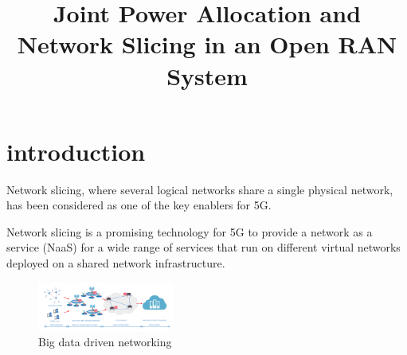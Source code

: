\documentclass[conference]{IEEEtran}
\begin{document}
\title{Joint Power Allocation and Network Slicing in an Open RAN System \vspace{-.1cm}
}
%
  \author{
  }

\maketitle

\begin{abstract}

\end{abstract}
\begin{IEEEkeywords}

\end{IEEEkeywords}
\section{introduction}
Network slicing, where several logical
networks share a single physical network, has been considered as one of
the key enablers for 5G. 

Network slicing is a promising technology for
5G to provide a network as a service (NaaS) for a wide range of
services that run on different virtual networks deployed on a
shared network infrastructure. 

\begin{figure}[h!]
\centering
\includegraphics[width=0.4\textwidth]{Capture1.PNG}
\caption{ Big data driven networking}
\label{fig:Bigdata}
\end{figure}
\end{document}
